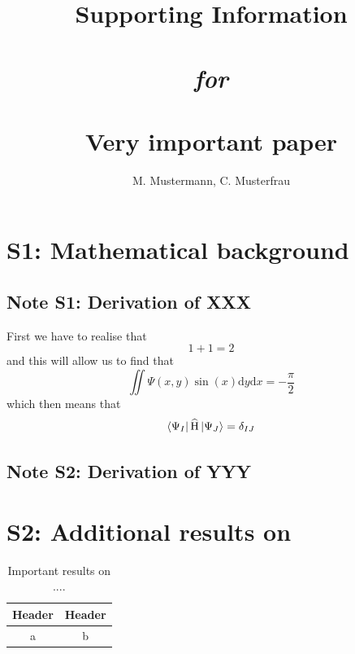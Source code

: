 \documentclass[10pt,a4paper]{article}
\newcommand{\sititle}[1]{\title{Supporting Information\\~\\\emph{for}\\~\\ \textbf{#1}}}
\begin{document}
\sititle{Very important paper}
\author{M. Mustermann, C. Musterfrau}

\maketitle

\vspace{2em}
\tableofcontents
\listoftables
\listoffigures

\newpage

\section{S1: Mathematical background}
\subsection{Note S1: Derivation of XXX}
First we have to realise that
%
\begin{equation}
1 + 1 = 2
\end{equation}
%
and this will allow us to find that
%
\begin{equation}
\iint \Psi(x,y)\sin(x)\mathrm{d}y \mathrm{d}x = -\frac{\pi}{2}
\end{equation}
%
which then means that
%
\begin{equation}
\bra{\Psi_I}\widehat{\mathrm{H}}\ket{\Psi_J} = \delta_{IJ}
\end{equation}

\subsection{Note S2: Derivation of YYY}

\newpage

\section{S2: Additional results on }

\phantom{ } %

\begin{table}[h!]
\centering
\caption{Important results on ....}

\begin{tabular}{cc}
\hline
Header & Header\\
\hline
a & b\\
\hline
\end{tabular}
\end{table}
\end{document}
